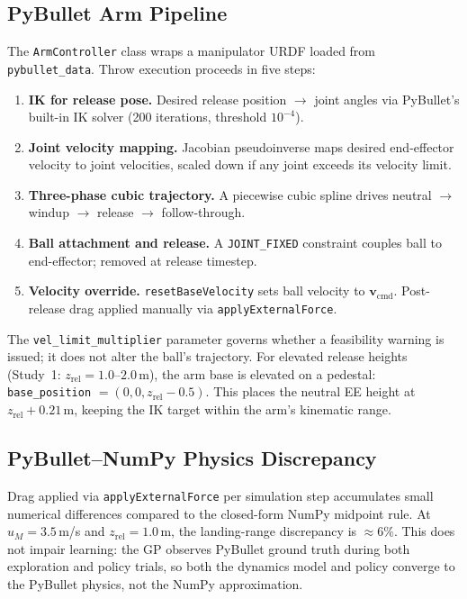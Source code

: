 \subsection{PyBullet Arm Pipeline}
\label{sec:system:pybullet}

The \texttt{ArmController} class wraps a manipulator URDF loaded from
\texttt{pybullet\_data}.
Throw execution proceeds in five steps:

\begin{enumerate}
  \item \textbf{IK for release pose.}  Desired release position $\to$ joint angles
        via PyBullet's built-in IK solver (200 iterations, threshold $10^{-4}$).

  \item \textbf{Joint velocity mapping.}  Jacobian pseudoinverse maps desired
        end-effector velocity to joint velocities, scaled down if any joint exceeds
        its velocity limit.

  \item \textbf{Three-phase cubic trajectory.}  A piecewise cubic spline drives
        neutral $\to$ windup $\to$ release $\to$ follow-through.

  \item \textbf{Ball attachment and release.}  A \texttt{JOINT\_FIXED} constraint
        couples ball to end-effector; removed at release timestep.

  \item \textbf{Velocity override.}  \texttt{resetBaseVelocity} sets ball velocity to
        $\mathbf{v}_{\mathrm{cmd}}$. Post-release drag applied manually via
        \texttt{applyExternalForce}.
\end{enumerate}

The \texttt{vel\_limit\_multiplier} parameter governs whether a feasibility warning
is issued; it does not alter the ball's trajectory.
For elevated release heights (Study~1: $z_{\mathrm{rel}} = 1.0$--$2.0$\,m), the arm
base is elevated on a pedestal: \texttt{base\_position} $= (0, 0, z_{\mathrm{rel}} - 0.5)$.
This places the neutral EE height at $z_{\mathrm{rel}} + 0.21$\,m, keeping the IK
target within the arm's kinematic range.

\subsection{PyBullet--NumPy Physics Discrepancy}
\label{sec:system:discrepancy}

Drag applied via \texttt{applyExternalForce} per simulation step accumulates small
numerical differences compared to the closed-form NumPy midpoint rule.
At $u_M = 3.5$\,m/s and $z_{\mathrm{rel}} = 1.0$\,m, the landing-range discrepancy
is $\approx 6\%$.
This does not impair learning: the GP observes PyBullet ground truth during both
exploration and policy trials, so both the dynamics model and policy converge to the
PyBullet physics, not the NumPy approximation.
